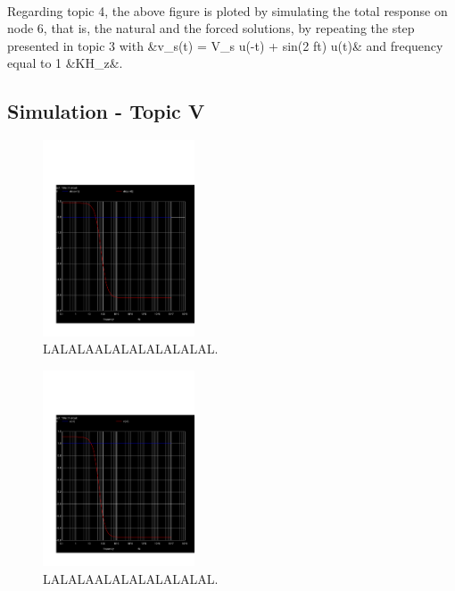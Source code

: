 \paragraph{}
Regarding topic 4, the above figure is ploted by simulating the total response on node 6, that is, the natural and the forced solutions, by repeating the step presented in topic 3 with &v_s(t) = V_s u(-t) + sin(2 \pi ft) u(t)& and frequency equal to 1 &KH_z&. 


\subsection{Simulation - Topic V}
\label{subsec:sim_fifth}

\begin{figure}[H] \centering
\includegraphics[width=0.4\textwidth]{acm.pdf}
\caption{LALALAALALALALALALAL.}
\label{fig:LALALAAL}
\end{figure}


\begin{figure}[H] \centering
\includegraphics[width=0.4\textwidth]{acp.pdf}
\caption{LALALAALALALALALALAL.}
\label{fig:LALALAAL}
\end{figure}


\pagebreak
